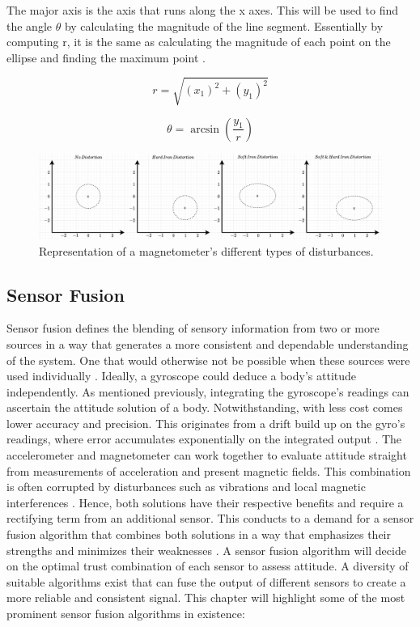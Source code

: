 The major axis is the axis that runs along the x axes. This will be used to find the angle $\theta$ by calculating the magnitude of the line segment. Essentially by computing r, it is the same as calculating the magnitude of each point on the ellipse and finding the maximum point \cite{daponte2017method}.

\begin{equation}
  r=\sqrt{(x_1)^2+(y_1)^2}
\end{equation}

\begin{equation}
  \theta=\arcsin(\frac{y_1}{r})
\end{equation}

\begin{figure}[!h]
  \centering
  \includegraphics[width=1\textwidth]{figures/magnetometer_distortion.pdf}
  \caption{Representation of a magnetometer's different types of disturbances. \cite{daponte2017method} }
  \label{fig:magnetometer_distortion}
\end{figure}



\subsection{Sensor Fusion}
\label{sub:sensor_fusion}

Sensor fusion defines the blending of sensory information from two or more sources in a way that generates a more consistent and dependable understanding of the system. One that would otherwise not be possible when these sources were used individually \cite{bostrom2007definition}. Ideally, a gyroscope could deduce a body's attitude independently. As mentioned previously, integrating the gyroscope's readings can ascertain the attitude solution of a body. Notwithstanding, with less cost comes lower accuracy and precision. This originates from a drift build up on the gyro's readings, where error accumulates exponentially on the integrated output \cite{borenstein2009heuristic}. The accelerometer and magnetometer can work together to evaluate attitude straight from measurements of acceleration and present magnetic fields. This combination is often corrupted by disturbances such as vibrations and local magnetic interferences \cite{silva2021error}. Hence, both solutions have their respective benefits and require a rectifying term from an additional sensor. This conducts to a demand for a sensor fusion algorithm that combines both solutions in a way that emphasizes their strengths and minimizes their weaknesses \cite{hol2011sensor}. A sensor fusion algorithm will decide on the optimal trust combination of each sensor to assess attitude. A diversity of suitable algorithms exist that can fuse the output of different sensors to create a more reliable and consistent signal. This chapter will highlight some of the most prominent sensor fusion algorithms in existence:


